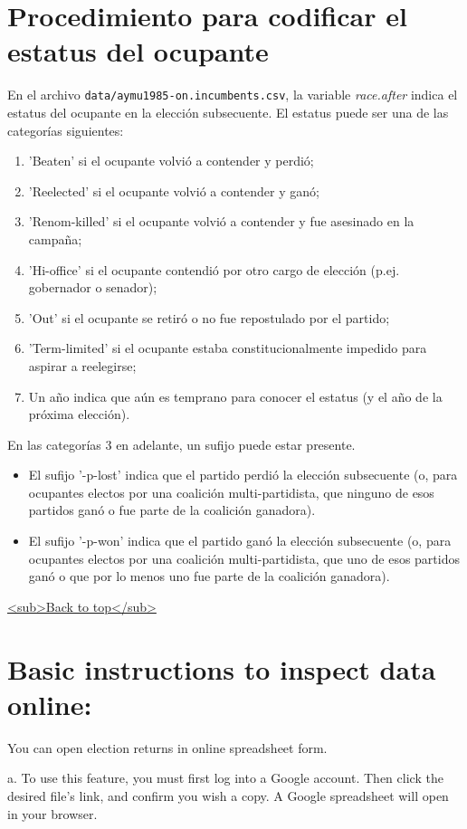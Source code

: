 \documentclass[11pt]{article}
\begin{document}
\section{Procedimiento para codificar el estatus del ocupante\label{orgbfd88bb}}
\label{sec:orgaa4aeb2}
En el archivo \texttt{data/aymu1985-on.incumbents.csv}, la variable \emph{race.after} indica el estatus del ocupante en la elección subsecuente. El estatus puede ser una de las categorías siguientes: 
\begin{enumerate}
\item 'Beaten' si el ocupante volvió a contender y perdió;
\item 'Reelected' si el ocupante volvió a contender y ganó;
\item 'Renom-killed' si el ocupante volvió a contender y fue asesinado en la campaña;
\item 'Hi-office' si el ocupante contendió por otro cargo de elección (p.ej. gobernador o senador);
\item 'Out' si el ocupante se retiró o no fue repostulado por el partido;
\item 'Term-limited' si el ocupante estaba constitucionalmente impedido para aspirar a reelegirse;
\item Un año indica que aún es temprano para conocer el estatus (y el año de la próxima elección).
\end{enumerate}
En las categorías 3 en adelante, un sufijo puede estar presente. 
\begin{itemize}
\item El sufijo '-p-lost' indica que el partido perdió la elección subsecuente (o, para ocupantes electos por una coalición multi-partidista, que ninguno de esos partidos ganó o fue parte de la coalición ganadora).
\item El sufijo '-p-won' indica que el partido ganó la elección subsecuente (o, para ocupantes electos por una coalición multi-partidista, que uno de esos partidos ganó o que por lo menos uno fue parte de la coalición ganadora).
\end{itemize}
\hyperref[org5520298]{<sub>Back to top</sub>}
\section{Basic instructions to inspect data online:\label{org0025864}}
\label{sec:org05d0423}
You can open election returns in online spreadsheet form. 

a. To use this feature, you must first log into a Google account. Then click the desired file's link, and confirm you wish a copy. A Google spreadsheet will open in your browser. 
\end{document}
